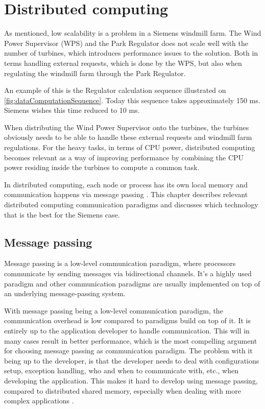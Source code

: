 \chapter{Distributed computing}
As mentioned, low scalability is a problem in a Siemens windmill farm. The Wind Power Supervisor (WPS) and the Park Regulator does not scale well with the number of turbines, which introduces performance issues to the solution. Both in terms handling external requests, which is done by the WPS, but also when regulating the windmill farm through the Park Regulator. 

An example of this is the Regulator calculation sequence illustrated on \cref{fig:dataComputationSequence}. Today this sequence takes approximately 150 ms. Siemens wishes this time reduced to 10 ms.

When distributing the Wind Power Supervisor onto the turbines, the turbines obviously needs to be able to handle these external requests and windmill farm regulations. For the heavy tasks, in terms of CPU power, distributed computing becomes relevant as a way of improving performance by combining the CPU power residing inside the turbines to compute a common task. 

In distributed computing, each node or process has its own local memory and communication happens via message passing \cite{andrews2000foundations}. This chapter describes relevant distributed computing communication paradigms and discusses which technology that is the best for the Siemens case. 


\section{Message passing}

Message passing is a low-level communication paradigm, where processors communicate by sending messages via bidirectional channels. It's a highly used paradigm and other communication paradigms are usually implemented on top of an underlying message-passing system.  

With message passing being a low-level communication paradigm, the communication overhead is low compared to paradigms build on top of it. It is entirely up to the application developer to handle communication. This will in many cases result in better performance, which is the most compelling argument for choosing message passing as communication paradigm. The problem with it being up to the developer, is that the developer needs to deal with configurations setup, exception handling, who and when to communicate with, etc., when developing the application. This makes it hard to develop using message passing, compared to distributed shared memory, especially when dealing with more complex applications \cite{lu1995message}. 

